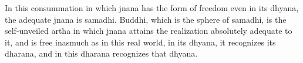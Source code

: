 In this consummation in which jnana has
the form of freedom even in its dhyana,
the adequate jnana is samadhi.
Buddhi, which is the sphere of samadhi,
is the self-unveiled artha in which jnana attains
the realization absolutely adequate to it,
and is free inasmuch as in this real world,
in its dhyana, it recognizes its dharana,
and in this dharana recognizes that dhyana.
